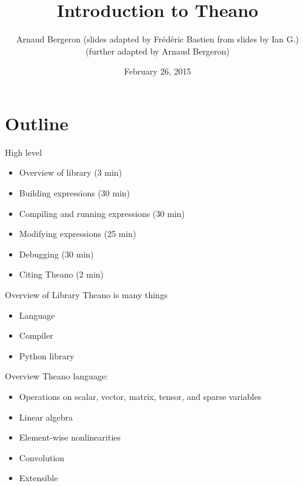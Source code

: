\documentclass[utf8x,hyperref={pdfpagelabels=false}]{beamer}
\title{Introduction to Theano}
\author{%
\footnotesize
Arnaud Bergeron \newline
(slides adapted by Frédéric Bastien from slides by Ian G.) \newline
(further adapted by Arnaud Bergeron)
}
\date{February 26, 2015}
\begin{document}
\begin{frame}[plain]
 \titlepage
\end{frame}

\section{Outline}
\begin{frame}{High level}\setcounter{page}{1}
  \begin{itemize}
  \item Overview of library (3 min)
  \item Building expressions (30 min)
  \item Compiling and running expressions (30 min)
  \item Modifying expressions (25 min)
  \item Debugging (30 min)
  \item Citing Theano (2 min)
  \end{itemize}
\end{frame}


\begin{frame}{Overview of Library}
  Theano is many things
  \begin{itemize}
  \item Language
  \item Compiler
  \item Python library
  \end{itemize}
\end{frame}

\begin{frame}{Overview}
  Theano language:
  \begin{itemize}
  \item Operations on scalar, vector, matrix, tensor, and sparse variables
  \item Linear algebra
  \item Element-wise nonlinearities
  \item Convolution
  \item Extensible
  \end{itemize}
\end{frame}
\end{document}
